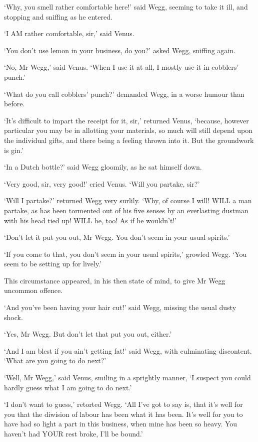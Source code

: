 ‘Why, you smell rather comfortable here!’ said Wegg, seeming to take it
ill, and stopping and sniffing as he entered.

‘I AM rather comfortable, sir,’ said Venus.

‘You don’t use lemon in your business, do you?’ asked Wegg, sniffing
again.

‘No, Mr Wegg,’ said Venus. ‘When I use it at all, I mostly use it in
cobblers’ punch.’

‘What do you call cobblers’ punch?’ demanded Wegg, in a worse humour
than before.

‘It’s difficult to impart the receipt for it, sir,’ returned Venus,
‘because, however particular you may be in allotting your materials,
so much will still depend upon the individual gifts, and there being a
feeling thrown into it. But the groundwork is gin.’

‘In a Dutch bottle?’ said Wegg gloomily, as he sat himself down.

‘Very good, sir, very good!’ cried Venus. ‘Will you partake, sir?’

‘Will I partake?’ returned Wegg very surlily. ‘Why, of course I will!
WILL a man partake, as has been tormented out of his five senses by
an everlasting dustman with his head tied up! WILL he, too! As if he
wouldn’t!’

‘Don’t let it put you out, Mr Wegg. You don’t seem in your usual
spirits.’

‘If you come to that, you don’t seem in your usual spirits,’ growled
Wegg. ‘You seem to be setting up for lively.’

This circumstance appeared, in his then state of mind, to give Mr Wegg
uncommon offence.

‘And you’ve been having your hair cut!’ said Wegg, missing the usual
dusty shock.

‘Yes, Mr Wegg. But don’t let that put you out, either.’

‘And I am blest if you ain’t getting fat!’ said Wegg, with culminating
discontent. ‘What are you going to do next?’

‘Well, Mr Wegg,’ said Venus, smiling in a sprightly manner, ‘I suspect
you could hardly guess what I am going to do next.’

‘I don’t want to guess,’ retorted Wegg. ‘All I’ve got to say is, that
it’s well for you that the diwision of labour has been what it has been.
It’s well for you to have had so light a part in this business, when
mine has been so heavy. You haven’t had YOUR rest broke, I’ll be bound.’

